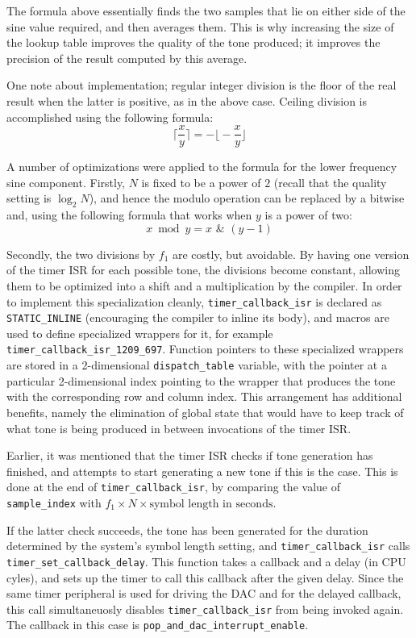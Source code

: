 \documentclass[11pt,a4paper,twocolumn]{scrartcl}
\begin{document}
The formula above essentially finds the two samples that lie on either side of the sine value required, and then averages them. This is why increasing the size of the lookup table improves the quality of the tone produced; it improves the precision of the result computed by this average.

One note about implementation; regular integer division is the floor of the real result when the latter is positive, as in the above case. Ceiling division is accomplished using the following formula\cite{warren2012hacker}:
$$ \bigg\lceil \frac{x}{y} \bigg\rceil = -\bigg\lfloor -\frac{x}{y} \bigg\rfloor $$

A number of optimizations were applied to the formula for the lower frequency sine component. Firstly, $N$ is fixed to be a power of $2$ (recall that the quality setting is $\log_2 N$), and hence the modulo operation can be replaced by a bitwise and, using the following formula that works when $y$ is a power of two:
$$ x \bmod y = x \,\,\&\,\, (y - 1) $$

Secondly, the two divisions by $f_1$ are costly, but avoidable. By having one version of the timer ISR for each possible tone, the divisions become constant, allowing them to be optimized into a shift and a multiplication by the compiler\cite{warren2012hacker}. In order to implement this specialization cleanly, \verb!timer_callback_isr! is declared as \verb!STATIC_INLINE! (encouraging the compiler to inline its body), and macros are used to define specialized wrappers for it, for example \verb!timer_callback_isr_1209_697!. Function pointers to these specialized wrappers are stored in a 2-dimensional \verb!dispatch_table! variable, with the pointer at a particular 2-dimensional index pointing to the wrapper that produces the tone with the corresponding row and column index. This arrangement has additional benefits, namely the elimination of global state that would have to keep track of what tone is being produced in between invocations of the timer ISR.

Earlier, it was mentioned that the timer ISR checks if tone generation has finished, and attempts to start generating a new tone if this is the case. This is done at the end of \verb!timer_callback_isr!, by comparing the value of \verb!sample_index! with $f_1 \times N \times \text{symbol length in seconds}$.

If the latter check succeeds, the tone has been generated for the duration determined by the system's symbol length setting, and \verb!timer_callback_isr! calls \verb!timer_set_callback_delay!. This function takes a callback and a delay (in CPU cyles), and sets up the timer to call this callback after the given delay. Since the same timer peripheral is used for driving the DAC and for the delayed callback, this call simultaneuosly disables \verb!timer_callback_isr! from being invoked again. The callback in this case is \verb!pop_and_dac_interrupt_enable!.
\end{document}
